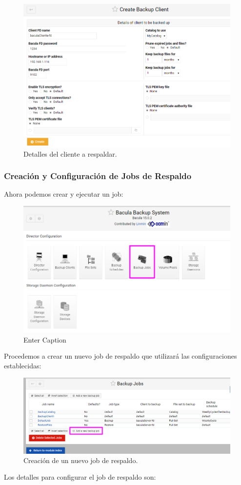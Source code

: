 \begin{figure}[H]
    \centering
    \includegraphics[width=0.5\linewidth]{instalacionBacula/detalesclienteparabuckup.png}
    \caption{Detalles del cliente a respaldar.}
\end{figure}

\subsubsection{Creación y Configuración de Jobs de Respaldo}
Ahora podemos crear y ejecutar un job:

\begin{figure}[H]
    \centering
    \includegraphics[width=0.5\linewidth]{instalacionBacula/createJOB.png}
    \caption{Enter Caption}
\end{figure}
Procedemos a crear un nuevo job de respaldo que utilizará las configuraciones establecidas:

\begin{figure}[H]
    \centering
    \includegraphics[width=0.5\linewidth]{instalacionBacula/createnewjob.png}
    \caption{Creación de un nuevo job de respaldo.}
\end{figure}

Los detalles para configurar el job de respaldo son:

